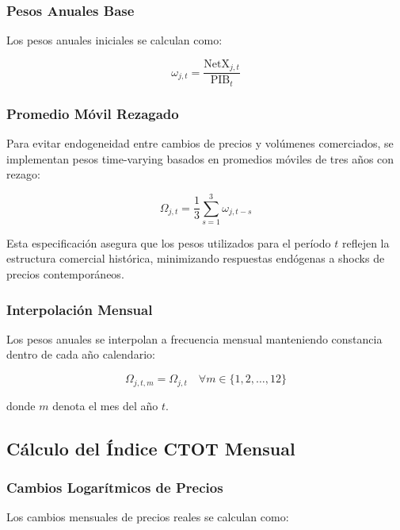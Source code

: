 \documentclass[12pt,a4paper]{article}
\begin{document}
\subsubsection{Pesos Anuales Base}
Los pesos anuales iniciales se calculan como:

\begin{equation}
\omega_{j,t} = \frac{\text{NetX}_{j,t}}{\text{PIB}_t}
\label{eq:annual_weights}
\end{equation}

\subsubsection{Promedio Móvil Rezagado}
Para evitar endogeneidad entre cambios de precios y volúmenes comerciados, se implementan pesos time-varying basados en promedios móviles de tres años con rezago:

\begin{equation}
\Omega_{j,t} = \frac{1}{3} \sum_{s=1}^{3} \omega_{j,t-s}
\label{eq:time_varying_weights}
\end{equation}

Esta especificación asegura que los pesos utilizados para el período $t$ reflejen la estructura comercial histórica, minimizando respuestas endógenas a shocks de precios contemporáneos.

\subsubsection{Interpolación Mensual}
Los pesos anuales se interpolan a frecuencia mensual manteniendo constancia dentro de cada año calendario:

\begin{equation}
\Omega_{j,t,m} = \Omega_{j,t} \quad \forall m \in \{1, 2, \ldots, 12\}
\label{eq:monthly_interpolation}
\end{equation}

donde $m$ denota el mes del año $t$.

\subsection{Cálculo del Índice CTOT Mensual}

\subsubsection{Cambios Logarítmicos de Precios}
Los cambios mensuales de precios reales se calculan como:
\end{document}
